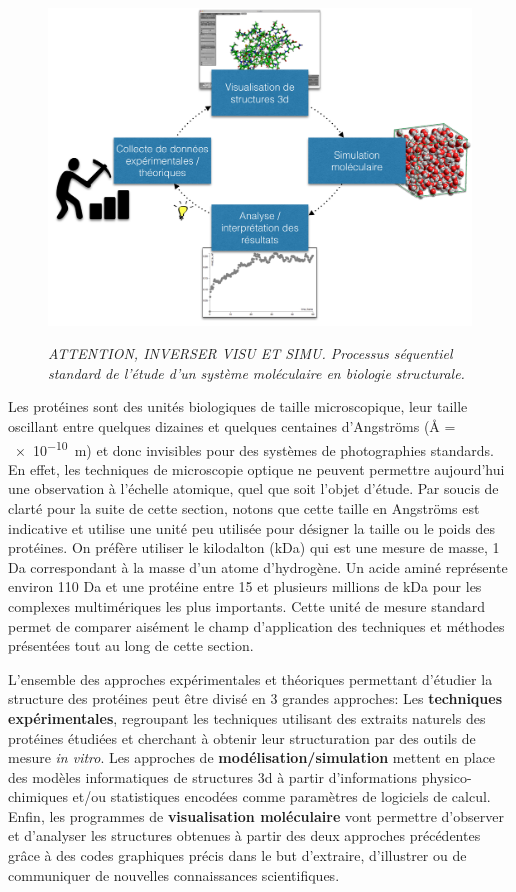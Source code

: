 \begin{figure}
  \centering
  {\includegraphics[width=.75\linewidth]{./figures/ch2/ch2_structural_biology_process}}
    \caption{{\it ATTENTION, INVERSER VISU ET SIMU.
    Processus séquentiel standard de l'étude d'un système moléculaire en biologie structurale.}}
  \label{Fig:schema_seq_bio_struct}
  \hspace{0.3cm}
\end{figure}


Les protéines sont des unités biologiques de taille microscopique, leur taille oscillant entre quelques dizaines et quelques centaines d'Angströms (\r{A} = \SI{e-10}{\metre}) et donc invisibles pour des systèmes de photographies standards. En effet, les techniques de microscopie optique ne peuvent permettre aujourd'hui une observation à l'échelle atomique, quel que soit l'objet d'étude. Par soucis de clarté pour la suite de cette section, notons que cette taille en Angströms est indicative et utilise une unité peu utilisée pour désigner la taille ou le poids des protéines. On préfère utiliser le kilodalton (kDa) qui est une mesure de masse, 1 Da correspondant à la masse d'un atome d'hydrogène. Un acide aminé représente environ 110 Da et une protéine entre 15 et plusieurs millions de kDa pour les complexes multimériques les plus importants. Cette unité de mesure standard permet de comparer aisément le champ d'application des techniques et méthodes présentées tout au long de cette section.

L'ensemble des approches expérimentales et théoriques permettant d'étudier la structure des protéines peut être divisé en 3 grandes approches: Les \textbf{techniques expérimentales}, regroupant les techniques utilisant des extraits naturels des protéines étudiées et cherchant à obtenir leur structuration par des outils de mesure \textit{in vitro}. Les approches de \textbf{modélisation/simulation} mettent en place des modèles informatiques de structures 3d à partir d'informations physico-chimiques et/ou statistiques encodées comme paramètres de logiciels de calcul. Enfin, les programmes de \textbf{visualisation moléculaire} vont permettre d'observer et d'analyser les structures obtenues à partir des deux approches précédentes grâce à des codes graphiques précis dans le but d'extraire, d'illustrer ou de communiquer de nouvelles connaissances scientifiques.

